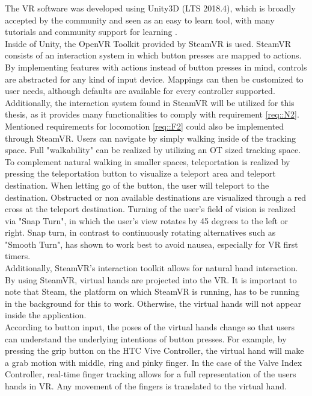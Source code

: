 The VR software was developed using Unity3D (LTS 2018.4), which is broadly accepted by the community and seen as an easy to learn tool, with many tutorials and community 
support for learning \cite{bartneck2015robot}.
\\ Inside of Unity, the OpenVR Toolkit provided by SteamVR is used.
SteamVR consists of an interaction system in which button presses are mapped to actions.
By implementing features with actions instead of button presses in mind, controls are abstracted for any kind of input device.
Mappings can then be customized to user needs, although defaults are available for every controller supported.
\\ Additionally, the interaction system found in SteamVR will be utilized for this thesis, as it provides many functionalities to comply with requirement \ref{req::N2}.
Mentioned requirements for locomotion \ref{req::F2} could also be implemented through SteamVR.
Users can navigate by simply walking inside of the tracking space.
Full "walkability" can be realized by utilizing an OT sized tracking space.
To complement natural walking in smaller spaces, teleportation is realized by pressing the teleportation button to visualize a teleport area and teleport destination.
When letting go of the button, the user will teleport to the destination.
Obstructed or non available destinations are visualized through a red cross at the teleport destination.
Turning of the user's field of vision is realized via "Snap Turn", in which the user's view rotates by 45 degrees to the left or right.
Snap turn, in contrast to continuously rotating alternatives such as "Smooth Turn", has shown to work best to avoid nausea, especially for VR first timers. 
\\ Additionally, SteamVR's interaction toolkit allows for natural hand interaction.
By using SteamVR, virtual hands are projected into the VR.
It is important to note that Steam, the platform on which SteamVR is running, has to be running in the background for this to work.
Otherwise, the virtual hands will not appear inside the application.
\\ According to button input, the poses of the virtual hands change so that users can understand the underlying intentions of button presses.
For example, by pressing the grip button on the HTC Vive Controller, the virtual hand will make a grab motion with middle, ring and pinky finger.
In the case of the Valve Index Controller, real-time finger tracking allows for a full representation of the users hands in VR.
Any movement of the fingers is translated to the virtual hand.
